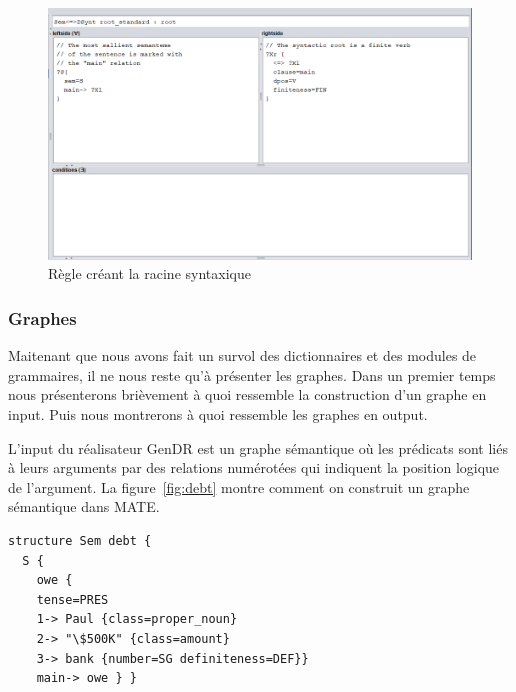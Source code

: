 \begin{figure}[htb]
	\centering
	\includegraphics[width=1\textwidth, trim = {0cm 0cm 0cm 0cm},clip]{ch3/figs/grammaire.png}
	\caption{Règle créant la racine syntaxique}
	\label{fig:root}
\end{figure}


\subsubsection{Graphes}\label{entree-sortie}

Maitenant que nous avons fait un survol des dictionnaires et des modules de grammaires, il ne nous reste qu'à présenter les graphes. Dans un premier temps nous présenterons brièvement à quoi ressemble la construction d'un graphe en input. Puis nous montrerons à quoi ressemble les graphes en output.

L'input du réalisateur GenDR est un graphe sémantique \citep{mel2012semantics} où les prédicats sont liés à leurs arguments par des relations numérotées qui indiquent la position logique de l'argument. La figure~\ref{fig:debt} montre comment on construit un graphe sémantique dans MATE.

\begin{lstlisting}[language=XML, caption = Input sémantique, label=fig:debt]
structure Sem debt {
  S {
    owe {
    tense=PRES
    1-> Paul {class=proper_noun}
    2-> "\$500K" {class=amount}
    3-> bank {number=SG definiteness=DEF}}
    main-> owe } }
\end{lstlisting}

